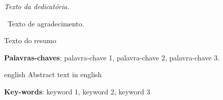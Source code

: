 \documentclass[
    12pt,               %
    openright,          %
    oneside,            %
    a4paper,            %
    english,            %
    brazil              %
    ]{abntex2}
\begin{document}
\frenchspacing

\imprimircapa

\imprimirfolhaderosto

 \begin{dedicatoria}
   \vspace*{\fill}
   \centering
   \noindent
   \textit{ Texto da dedicatória.} \vspace*{\fill}
 \end{dedicatoria}

 \begin{agradecimentos}
 Texto de agradecimento.

 \end{agradecimentos}

 \begin{epigrafe}
     \vspace*{\fill}
    \begin{flushright}
        \textit{}
    \end{flushright}
 \end{epigrafe}

\setlength{\absparsep}{18pt} %
\begin{resumo}

Texto do resumo

\textbf{Palavras-chaves}: palavra-chave 1, palavra-chave 2, palavra-chave 3.
\end{resumo}

\begin{resumo}[Abstract]
 \begin{otherlanguage*}{english}
    Abstract text in english
   
   \textbf{Key-words}: keyword 1, keyword 2, keyword 3
 \end{otherlanguage*}
\end{resumo}
\end{document}
